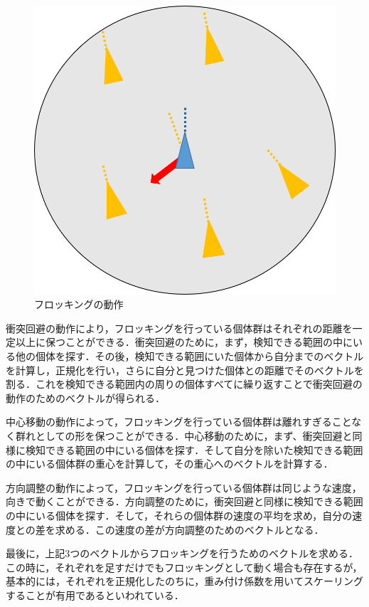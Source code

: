 \documentclass[a4paper,11pt]{jarticle}
\begin{document}
\begin{figure}
		\begin{minipage}{0.3\linewidth}
			\centering
			\includegraphics[width=0.9\linewidth]{png/alighnment.png}
		\end{minipage}
		\caption[フロッキング]{フロッキングの動作}
		\label{fig:flocking}
	\end{figure}
	
	衝突回避の動作により，フロッキングを行っている個体群はそれぞれの距離を一定以上に保つことができる．衝突回避のために，まず，検知できる範囲の中にいる他の個体を探す．その後，検知できる範囲にいた個体から自分までのベクトルを計算し，正規化を行い，さらに自分と見つけた個体との距離でそのベクトルを割る．これを検知できる範囲内の周りの個体すべてに繰り返すことで衝突回避の動作のためのベクトルが得られる．
	
	中心移動の動作によって，フロッキングを行っている個体群は離れすぎることなく群れとしての形を保つことができる．中心移動のために，まず、衝突回避と同様に検知できる範囲の中にいる個体を探す．そして自分を除いた検知できる範囲の中にいる個体群の重心を計算して，その重心へのベクトルを計算する．
	
	方向調整の動作によって，フロッキングを行っている個体群は同じような速度，向きで動くことができる．方向調整のために，衝突回避と同様に検知できる範囲の中にいる個体を探す．そして，それらの個体群の速度の平均を求め，自分の速度との差を求める．この速度の差が方向調整のためのベクトルとなる．
	
	最後に，上記3つのベクトルからフロッキングを行うためのベクトルを求める．この時に，それぞれを足すだけでもフロッキングとして動く場合も存在するが，基本的には，それぞれを正規化したのちに，重み付け係数を用いてスケーリングすることが有用であるといわれている．
	
\end{document}
